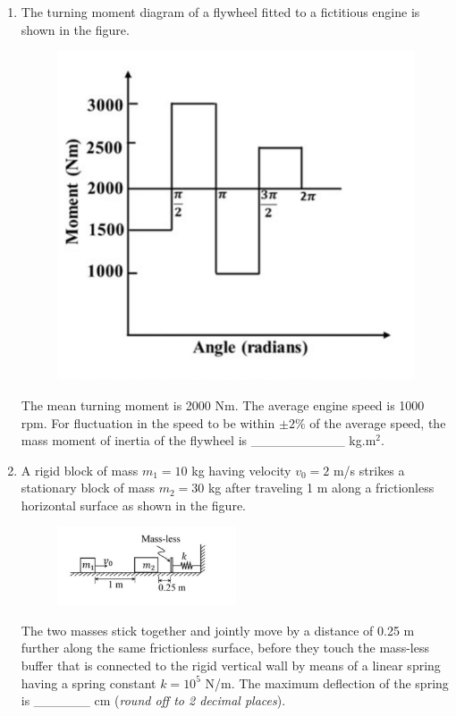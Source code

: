 \documentclass[12pt,onecolumn]{article}
\begin{document}
\begin{enumerate}
    \item The turning moment diagram of a flywheel fitted to a fictitious engine is shown in the figure.
          \begin{figure}[H]
              \centering
              \includegraphics[scale=0.4]{q39s2}
              \label{fig:q39s2}
          \end{figure}
          The mean turning moment is 2000 Nm. The average engine speed is 1000 rpm. For fluctuation in the speed to be within $\pm2\%$ of the average speed, the mass moment of inertia of the flywheel is \_\_\_\_\_\_\_\_\_\_ kg.m$^2$.

    \item A rigid block of mass $m_1 = 10$ kg having velocity $v_0 = 2$ m/s strikes a stationary block of mass $m_2 = 30$ kg after traveling 1 m along a frictionless horizontal surface as shown in the figure.
          \begin{figure}[H]
              \centering
              \includegraphics[width=0.5\textwidth]{q40s2}
              \label{fig:q40s2}
          \end{figure}
          The two masses stick together and jointly move by a distance of 0.25 m further along the same frictionless surface, before they touch the mass-less buffer that is connected to the rigid vertical wall by means of a linear spring having a spring constant $k = 10^5$ N/m. The maximum deflection of the spring is \_\_\_\_\_\_ cm (\textit{round off to 2 decimal places}).


\end{enumerate}
\end{document}
